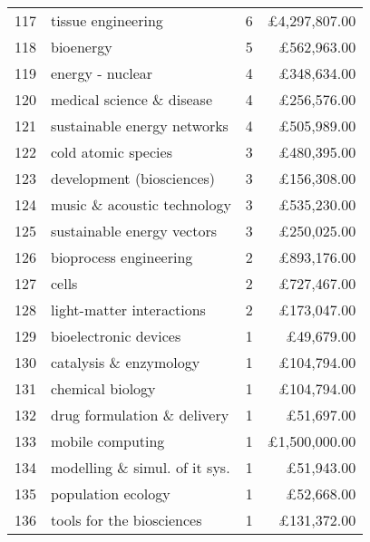 \begin{spacing}{0.9}
\begin{longtable}[c]{r|>{\raggedleft\arraybackslash}m{6.5cm}|>{\raggedleft\arraybackslash}m{1.9cm}|r}
{117} & {tissue engineering} & {6} & {\pounds4,297,807.00}\\
{118} & {bioenergy} & {5} & {\pounds562,963.00}\\
{119} & {energy - nuclear} & {4} & {\pounds348,634.00}\\
{120} & {medical science \& disease} & {4} & {\pounds256,576.00}\\
{121} & {sustainable energy networks} & {4} & {\pounds505,989.00}\\
{122} & {cold atomic species} & {3} & {\pounds480,395.00}\\
{123} & {development (biosciences)} & {3} & {\pounds156,308.00}\\
{124} & {music \& acoustic technology} & {3} & {\pounds535,230.00}\\
{125} & {sustainable energy vectors} & {3} & {\pounds250,025.00}\\
{126} & {bioprocess engineering} & {2} & {\pounds893,176.00}\\
{127} & {cells} & {2} & {\pounds727,467.00}\\
{128} & {light-matter interactions} & {2} & {\pounds173,047.00}\\
{129} & {bioelectronic devices} & {1} & {\pounds49,679.00}\\
{130} & {catalysis \& enzymology} & {1} & {\pounds104,794.00}\\
{131} & {chemical biology} & {1} & {\pounds104,794.00}\\
{132} & {drug formulation \& delivery} & {1} & {\pounds51,697.00}\\
{133} & {mobile computing} & {1} & {\pounds1,500,000.00}\\
{134} & {modelling \& simul. of it sys.} & {1} & {\pounds51,943.00}\\
{135} & {population ecology} & {1} & {\pounds52,668.00}\\
{136} & {tools for the biosciences} & {1} & {\pounds131,372.00}
\end{longtable}
\end{spacing}

